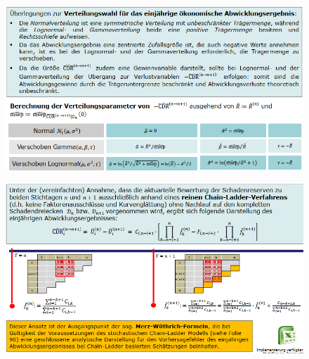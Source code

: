 \documentclass[12pt]{report}
\theoremstyle{dotless}
\theoremstyle{definition}
\begin{document}
\begin{figure}[ht]
	\centering
	\includegraphics[width= \textwidth]{Bilder/Merz2.png}
\end{figure}

\begin{figure}[ht]
	\centering
	\includegraphics[width= \textwidth]{Bilder/Merz3.png}
\end{figure}
\end{document}
